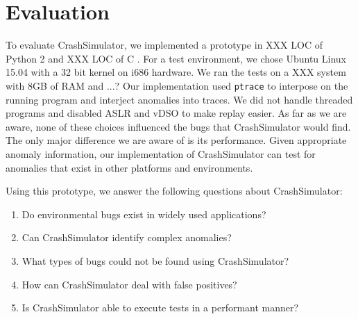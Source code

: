 \section{Evaluation}


To evaluate CrashSimulator, we implemented a prototype in XXX LOC of Python 2 
and XXX LOC of C .  For a test
environment, we chose Ubuntu Linux 15.04 with a 32 bit kernel on i686 hardware.
We ran the tests on a XXX system with 8GB of RAM and ...?   Our
implementation used {\tt ptrace} to interpose on the running program and
interject anomalies into traces.
We did not handle threaded programs and disabled ASLR and vDSO to make replay 
easier.  As far as we are aware, none of these choices influenced the bugs
that CrashSimulator would find.  The only major difference we are aware of 
is its performance.
Given appropriate anomaly information, our implementation of CrashSimulator can
test for anomalies that exist in other platforms and environments.  


Using this prototype, we answer the following questions about CrashSimulator:

\begin{enumerate}
   \item{Do environmental bugs exist in widely used applications?}
   \item{Can CrashSimulator identify complex anomalies?}
   \item{What types of bugs could not be found using CrashSimulator?}
   \item{How can CrashSimulator deal with false positives?}
   \item{Is CrashSimulator able to execute tests in a performant manner?}
\end{enumerate}





